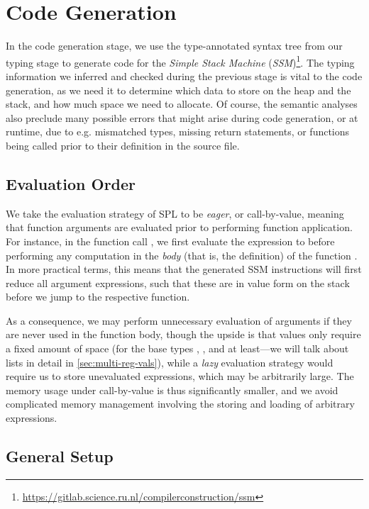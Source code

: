 \chapter{Code Generation}

In the code generation stage, we use the type-annotated syntax tree from our
typing stage to generate code for the \emph{Simple Stack Machine}
(\emph{SSM})\footnote{\url{https://gitlab.science.ru.nl/compilerconstruction/ssm}}.
The typing information we inferred and checked during the previous stage is
vital to the code generation, as we need it to determine which data to store on
the heap and the stack, and how much space we need to allocate.
Of course, the semantic analyses also preclude many possible errors that might
arise during code generation, or at runtime, due to e.g. mismatched types,
missing return statements, or functions being called prior to their definition
in the source file.


\section{Evaluation Order}

We take the evaluation strategy of SPL to be \emph{eager}, or call-by-value,
meaning that function arguments are evaluated prior to performing function
application. For instance, in the function call , we first evaluate
the expression  to  before performing any computation in the
\emph{body} (that is, the definition) of the function .
In more practical terms, this means that the generated SSM instructions will
first reduce all argument expressions, such that these are in value form on the
stack before we jump to the respective function.

As a consequence, we may perform unnecessary evaluation of arguments if they are
never used in the function body, though the upside is that values only require
a fixed amount of space (for the base types , , and
 at least---we will talk about lists in detail in
\cref{sec:multi-reg-vals}), while a \emph{lazy} evaluation strategy would
require us to store unevaluated expressions, which may be arbitrarily large.
The memory usage under call-by-value is thus significantly smaller, and we avoid
complicated memory management involving the storing and loading of arbitrary
expressions.


\section{General Setup}

